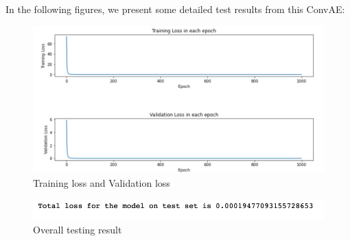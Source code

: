In the following figures, we present some detailed test results from this ConvAE:

\begin{figure}[H]
    \caption{Training loss and Validation loss}
    \includegraphics[scale=0.6]{Report LaTeX/figures/mantle_convection_images/limited_dataset/ConvAE_trainingData.png}
\end{figure}

\begin{figure}[H]
    \caption{Overall testing result}
    \includegraphics[scale=0.8]{Report LaTeX/figures/mantle_convection_images/limited_dataset/ConvAE_OverallTesting.png}
\end{figure}

